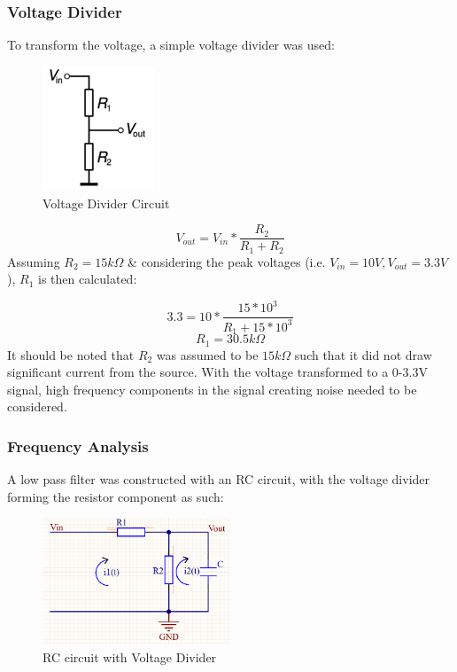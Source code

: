\documentclass[12pt, a4paper]{article}
\begin{document}
\subsubsection{Voltage Divider}
To transform the voltage, a simple voltage divider was used:
\begin{figure}[h]
    \centering
    \includegraphics[width=0.3\textwidth]{voltage divider.png}
    \caption{Voltage Divider Circuit}
    \label{fig:v_divider}
\end{figure}

\[V_{out}= V_{in}*\frac{R_2}{R_1+R_2}\]
Assuming $R_2=15k\Omega$ \& considering the peak voltages (i.e. $V_{in}=10V,  V_{out}=3.3V$), $R_1$ is then calculated:

\[3.3=10*\frac{15*10^3}{R_1+15*10^3}\]
\[R_1=30.5k\Omega\]
It should be noted that $R_2$ was assumed to be $15k\Omega$ such that it did not draw significant current from the source. 
With the voltage transformed to a 0-3.3V signal, high frequency components in the signal creating noise needed to be considered. 

\subsubsection{Frequency Analysis}
A low pass filter was constructed with an RC circuit, with the voltage divider forming the resistor component as such:
\begin{figure}[h]
    \centering
    \includegraphics[width=0.5\textwidth]{kvl.png}
    \caption{RC circuit with Voltage Divider}
    \label{fig:rc_w_vdivider}
\end{figure}
\end{document}
